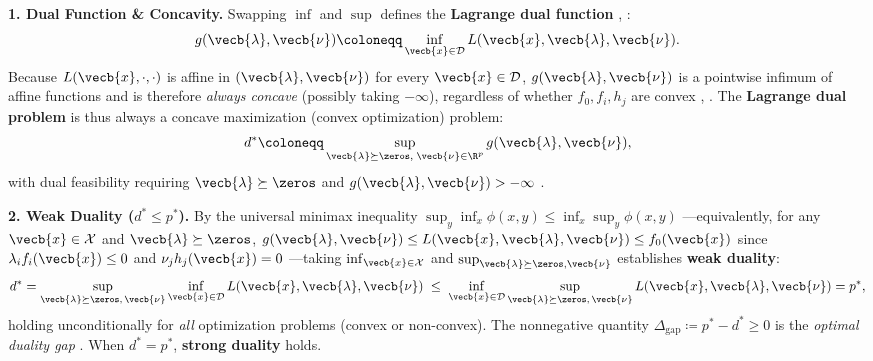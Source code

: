 \documentclass[../../../../master.tex]{subfiles}
\begin{document}
\begin{coremath}
\label{cm:convex:duality_slater}
\textbf{1. Dual Function \& Concavity.} Swapping $\inf$ and $\sup$ defines the \textbf{Lagrange dual function} , :
\begin{equation}
  g(\vecb{\lambda}, \vecb{\nu}) \coloneqq \inf_{\vecb{x} \in \mathcal{D}} L(\vecb{x}, \vecb{\lambda}, \vecb{\nu}).
  \label{eq:convex:dual_fn}
\end{equation}
Because $L(\vecb{x}, \cdot, \cdot)$ is affine in $(\vecb{\lambda}, \vecb{\nu})$ for every $\vecb{x} \in \mathcal{D}$, $g(\vecb{\lambda}, \vecb{\nu})$ is a pointwise infimum of affine functions and is therefore \emph{always concave} (possibly taking $-\infty$), regardless of whether $f_0, f_i, h_j$ are convex , . The \textbf{Lagrange dual problem} is thus always a concave maximization (convex optimization) problem:
\begin{equation}
  d^* \coloneqq \sup_{\vecb{\lambda} \succeq \zeros,\; \vecb{\nu} \in \R^p} g(\vecb{\lambda}, \vecb{\nu}),
  \label{eq:convex:dual_prob}
\end{equation}
with dual feasibility requiring $\vecb{\lambda} \succeq \zeros$ and $g(\vecb{\lambda}, \vecb{\nu}) > -\infty$ .

\textbf{2. Weak Duality ($d^* \le p^*$).} By the universal minimax inequality $\sup_y \inf_x \phi(x,y) \le \inf_x \sup_y \phi(x,y)$ ---equivalently, for any $\vecb{x} \in \mathcal{X}$ and $\vecb{\lambda} \succeq \zeros$, $g(\vecb{\lambda}, \vecb{\nu}) \le L(\vecb{x}, \vecb{\lambda}, \vecb{\nu}) \le f_0(\vecb{x})$ since $\lambda_i f_i(\vecb{x}) \le 0$ and $\nu_j h_j(\vecb{x}) = 0$ ---taking $\inf_{\vecb{x} \in \mathcal{X}}$ and $\sup_{\vecb{\lambda} \succeq \zeros, \vecb{\nu}}$ establishes \textbf{weak duality}:
\begin{equation}
  d^* = \sup_{\vecb{\lambda} \succeq \zeros,\, \vecb{\nu}} \inf_{\vecb{x} \in \mathcal{D}} L(\vecb{x}, \vecb{\lambda}, \vecb{\nu})
  \;\le\; \inf_{\vecb{x} \in \mathcal{D}} \sup_{\vecb{\lambda} \succeq \zeros,\, \vecb{\nu}} L(\vecb{x}, \vecb{\lambda}, \vecb{\nu}) = p^*,
  \label{eq:convex:weak_duality}
\end{equation}
holding unconditionally for \emph{all} optimization problems (convex or non-convex). The nonnegative quantity $\Delta_{\mathrm{gap}} \coloneqq p^* - d^* \ge 0$ is the \emph{optimal duality gap} . When $d^* = p^*$, \textbf{strong duality} holds.


\end{coremath}
\end{document}
